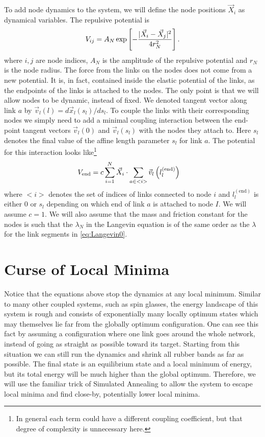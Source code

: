 \documentclass[nofootinbib,preprint,floatfix,titlepage,superscriptaddress]{revtex4} %
\begin{document}
To add node dynamics to the system, we will define the node positions $\vec{X}_i$ as dynamical variables. 
The repulsive potential is 
\begin{equation}
V_{ij} = %
A_N \exp\left[- {|\vec{X}_i-\vec{X}_j|^2 \over 4 r_N^2}\right]\label{eq:VIJ0}.
\end{equation}
where $i,j$ are node indices, $A_N$ is the amplitude of the repulsive potential and $r_N$ is the node radius. 
The force from the links on the nodes does  not come from a new potential. 
It is, in fact, contained inside the elastic potential of the links, %
as the endpoints of the links is attached to the nodes. The only point is that we will allow nodes to be dynamic, instead of fixed. We denoted tangent vector along link $a$ by $\vec{v}_l(l) = d\vec{x}_l(s_l)/ds_l $. To couple the links with their corresponding nodes we simply need to add a minimal coupling interaction between the end-point tangent vectors $\vec{v}_l (0)$ and $\vec{v}_l (s_l)$ with the nodes they attach to. Here $s_l$ denotes the final value of the affine length parameter $s_l$ for link $a$. The potential for this interaction looks like\footnote{In general each term could have a different coupling coefficient, but that degree of complexity is unnecessary here.}
\begin{align}
   V_{\mathrm{end}} & =c\sum_{i=1}^N \vec{X}_i \cdot \sum_{a\in <i>}  \vec{v}_l\left(l^{(\mathrm{end})}_l\right)
\end{align}
where $<i>$ denotes the set of indices of links connected to node $i$ and $l^{(\mathrm{end})}_l$ is either $0$ or $s_l$ depending on which end of link $a$ is attached to node $I$. We will assume $c =1$. We will also assume that the mass and friction constant for the nodes is such that the $\lambda_N$ in the Langevin equation is of the same order as the $\lambda$ for the link segments in \eqref{eq:Langevin0}. 

\section{Curse of Local Minima \label{ap:np}}
Notice that the equations above stop the dynamics at any local minimum. 
Similar to many other coupled systems, such as spin glasses\cite{parisi2002physical,pelissetto2002critical}, the energy landscape of this system is rough and consists of exponentially many locally optimum states which may themselves lie far from the globally optimum configuration. One can see this fact by assuming a configuration where one link goes around the whole network, instead of going as  straight as possible toward its target. Starting from this situation we can still run the dynamics and shrink all rubber bands as far as possible. The final state is an equilibrium state and a local minimum of energy, but its total energy will be much higher than the global optimum. Therefore, we will use the familiar trick of Simulated Annealing to allow the system to escape local minima and find close-by, potentially lower local minima.  
\end{document}
